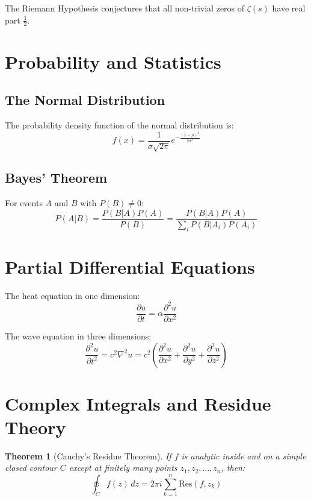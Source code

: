 \documentclass{article}
\newtheorem{theorem}{Theorem}
\begin{document}
The Riemann Hypothesis conjectures that all non-trivial zeros of $\zeta(s)$ have real part $\frac{1}{2}$.

\section{Probability and Statistics}

\subsection{The Normal Distribution}
The probability density function of the normal distribution is:
\begin{equation}
f(x) = \frac{1}{\sigma\sqrt{2\pi}} e^{-\frac{(x-\mu)^2}{2\sigma^2}}
\end{equation}

\subsection{Bayes' Theorem}
For events $A$ and $B$ with $P(B) \neq 0$:
\begin{equation}
P(A|B) = \frac{P(B|A)P(A)}{P(B)} = \frac{P(B|A)P(A)}{\sum_{i} P(B|A_i)P(A_i)}
\end{equation}

\section{Partial Differential Equations}

The heat equation in one dimension:
\begin{equation}
\frac{\partial u}{\partial t} = \alpha \frac{\partial^2 u}{\partial x^2}
\end{equation}

The wave equation in three dimensions:
\begin{equation}
\frac{\partial^2 u}{\partial t^2} = c^2 \nabla^2 u = c^2 \left(\frac{\partial^2 u}{\partial x^2} + \frac{\partial^2 u}{\partial y^2} + \frac{\partial^2 u}{\partial z^2}\right)
\end{equation}

\section{Complex Integrals and Residue Theory}

\begin{theorem}[Cauchy's Residue Theorem]
If $f$ is analytic inside and on a simple closed contour $C$ except at finitely many points $z_1, z_2, \ldots, z_n$, then:
\begin{equation}
\oint_C f(z) \, dz = 2\pi i \sum_{k=1}^{n} \text{Res}(f, z_k)
\end{equation}
\end{theorem}
\end{document}
